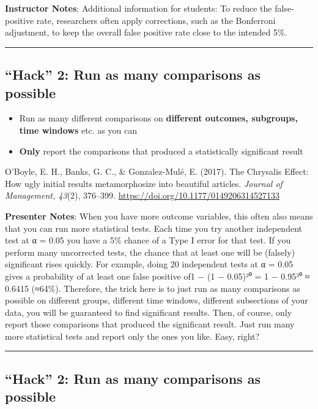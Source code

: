 \documentclass[
  english,
  letterpaper,
  DIV=11,
  numbers=noendperiod]{scrartcl}
\providecommand{\tightlist}{%
  \setlength{\itemsep}{0pt}\setlength{\parskip}{0pt}}
\begin{document}
\textbf{Instructor Notes}: Additional information for students: To
reduce the false-positive rate, researchers often apply corrections,
such as the Bonferroni adjustment, to keep the overall false positive
rate close to the intended 5\%.

\begin{center}\rule{0.5\linewidth}{0.5pt}\end{center}

\subsection{``Hack'' 2: Run as many comparisons as
possible}\label{hack-2-run-as-many-comparisons-as-possible}

\begin{itemize}
\tightlist
\item
  Run as many different comparisons on \textbf{different outcomes,
  subgroups, time windows} etc. as you can
\item
  \textbf{Only} report the comparisons that produced a statistically
  significant result
\end{itemize}

O'Boyle, E. H., Banks, G. C., \& Gonzalez-Mulé, E. (2017). The Chrysalis
Effect: How ugly initial results metamorphosize into beautiful articles.
\emph{Journal of Management, 43}(2), 376--399.
\url{https://doi.org/10.1177/0149206314527133}

\textbf{Presenter Notes}: When you have more outcome variables, this
often also means that you can run more statistical tests. Each time you
try another independent test at α = 0.05 you have a 5\% chance of a Type
I error for that test. If you perform many uncorrected tests, the chance
that at least one will be (falsely) significant rises quickly. For
example, doing 20 independent tests at α = 0.05 gives a probability of
at least one false positive of1 − (1 − 0.05)²⁰ = 1 − 0.95²⁰ ≈ 0.6415
(≈64\%). Therefore, the trick here is to just run as many comparisons as
possible on different groups, different time windows, different
subsections of your data, you will be guaranteed to find significant
results. Then, of course, only report those comparisons that produced
the significant result. Just run many more statistical tests and report
only the ones you like. Easy, right?

\begin{center}\rule{0.5\linewidth}{0.5pt}\end{center}

\subsection{``Hack'' 2: Run as many comparisons as
possible}\label{hack-2-run-as-many-comparisons-as-possible-1}
\end{document}
